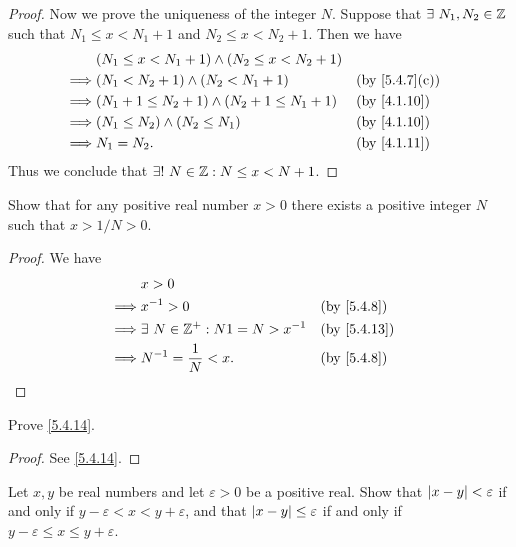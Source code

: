 \begin{proof}
  Now we prove the uniqueness of the integer \(N\).
  Suppose that \(\exists\ N_1, N_2 \in \mathbb{Z}\) such that \(N_1 \leq x < N_1 + 1\) and \(N_2 \leq x < N_2 + 1\).
  Then we have
  \begin{align*}
             & (N_1 \leq x < N_1 + 1) \land (N_2 \leq x < N_2 + 1)                                  \\
    \implies & (N_1 < N_2 + 1) \land (N_2 < N_1 + 1)               &  & \text{(by \cref{5.4.7}(c))} \\
    \implies & (N_1 + 1 \leq N_2 + 1) \land (N_2 + 1 \leq N_1 + 1) &  & \text{(by \cref{4.1.10})}   \\
    \implies & (N_1 \leq N_2) \land (N_2 \leq N_1)                 &  & \text{(by \cref{4.1.10})}   \\
    \implies & N_1 = N_2.                                          &  & \text{(by \cref{4.1.11})}
  \end{align*}
  Thus we conclude that \(\exists!\ N \in \mathbb{Z} : N \leq x < N + 1\).
\end{proof}

\begin{ex}\label{ex:5.4.4}
  Show that for any positive real number \(x > 0\) there exists a positive integer \(N\) such that \(x > 1 / N > 0\).
\end{ex}

\begin{proof}
  We have
  \begin{align*}
             & x > 0                                                                \\
    \implies & x^{-1} > 0                            &  & \text{(by \cref{5.4.8})}  \\
    \implies & \exists\ N \in \Z^+ : N1 = N > x^{-1} &  & \text{(by \cref{5.4.13})} \\
    \implies & N^{-1} = \dfrac{1}{N} < x.            &  & \text{(by \cref{5.4.8})}
  \end{align*}
\end{proof}

\begin{ex}\label{ex:5.4.5}
  Prove \cref{5.4.14}.
\end{ex}

\begin{proof}
  See \cref{5.4.14}.
\end{proof}

\begin{ex}\label{ex:5.4.6}
  Let \(x, y\) be real numbers and let \(\varepsilon > 0\) be a positive real.
  Show that \(\left\lvert x - y\right\rvert < \varepsilon\) if and only if \(y - \varepsilon < x < y + \varepsilon\), and that \(\left\lvert x - y\right\rvert \leq \varepsilon\) if and only if \(y - \varepsilon \leq x \leq y + \varepsilon\).
\end{ex}

